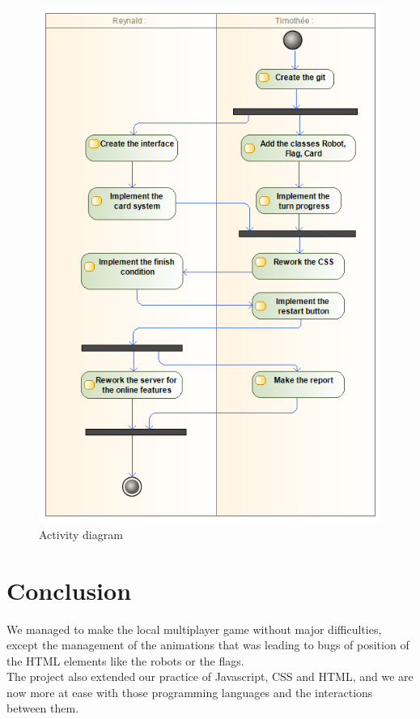 \documentclass[a4paper, 10pt, oneside]{article}
\begin{document}
	\begin{figure}[h]
		\centering
		\includegraphics[scale=0.4]{img/activity.png}
		\caption{Activity diagram}
		\label{fig:Activity}
	\end{figure}
	
\newpage
\section{Conclusion}
	We managed to make the local multiplayer game without major difficulties, except the management of the animations that was leading to bugs of position of the HTML elements like the robots or the flags.\\
	The project also extended our practice of Javascript, CSS and HTML, and we are now more at ease with those programming languages and the interactions between them.
\end{document}
